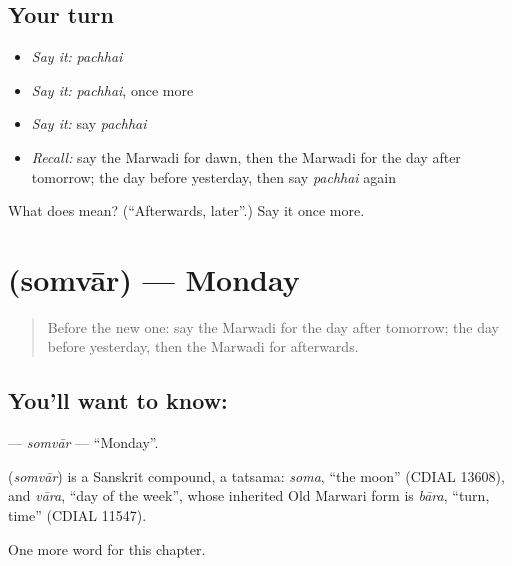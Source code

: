 \subsection*{Your turn}
\begin{itemize}
\raggedright
  \item \emph{Say it:} \emph{pachhai}
  \item \emph{Say it:} \emph{pachhai}, once more
  \item \emph{Say it:} say \emph{pachhai}
  \item \emph{Recall:} say the Marwadi for dawn, then the Marwadi for the day after tomorrow; the day before yesterday, then say \emph{pachhai} again
\end{itemize}

\begin{tcolorbox}[breakable,colback=teal!4,colframe=teal!35!black,title={Before you move on}]
What does  mean? (\textquotedblleft{}Afterwards, later\textquotedblright{}.) Say it once more.
\end{tcolorbox}
\section[\texorpdfstring{\mw{सोमवार} (somvār)}{सोमवार (somvār)}]{ (somvār) — Monday}

\label{lesson:MW-C91-somvar}



\begin{quote}
Before the new one: say the Marwadi for the day after tomorrow; the day before yesterday, then the Marwadi for afterwards.
\end{quote}

\subsection*{You'll want to know: }
\textbf{} — \emph{somvār} — \textquotedblleft{}Monday\textquotedblright{}.

\begin{cousinweb}
\textbf{} (\emph{somvār}) is a Sanskrit compound, a tatsama: \emph{soma}, \textquotedblleft{}the moon\textquotedblright{} (CDIAL 13608), and \emph{vāra}, \textquotedblleft{}day of the week\textquotedblright{}, whose inherited Old Marwari form is \emph{bāra}, \textquotedblleft{}turn, time\textquotedblright{} (CDIAL 11547).
\end{cousinweb}

\begin{grammarlens}[title={What you've built}]
One more word for this chapter.
\end{grammarlens}

